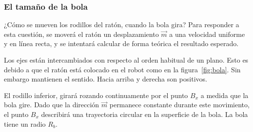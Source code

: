 \documentclass[10pt,a4paper,hidelinks,twocolumn]{article}
\begin{document}
\begin{center}
\end{center}

\subsubsection{El tamaño de la bola}

¿Cómo se mueven los rodillos del ratón, cuando la bola gira? Para responder a 
esta cuestión, se moverá el ratón un desplazamiento $\vec{m}$ a una velocidad 
uniforme y en línea recta, y se intentará calcular de forma teórica el resultado 
esperado.

Los ejes están intercambiados con respecto al orden habitual de un plano. Esto 
es debido a que el ratón está colocado en el robot como en la 
figura~\ref{fig:bola}. Sin embargo mantienen el sentido. Hacia arriba y derecha 
son positivos.

El rodillo inferior, girará rozando continuamente por el punto $B_x$ a medida 
que la bola gire. Dado que la dirección $\vec{m}$ permanece constante durante 
este movimiento, el punto $B_x$ describirá una trayectoria circular en la 
superficie de la bola. La bola tiene un radio $R_b$.
\end{document}
